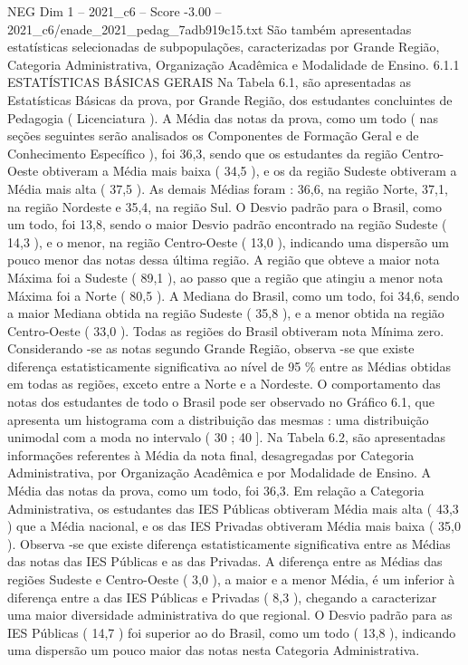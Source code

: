 \begin{textsample}{NEG Dim 1 – 2021\_c6 – Score -3.00 – 2021\_c6/enade\_2021\_pedag\_7adb919c15.txt}
São também apresentadas estatísticas selecionadas de subpopulações, caracterizadas por Grande Região, Categoria Administrativa, Organização Acadêmica e Modalidade de Ensino. 6.1.1 ESTATÍSTICAS BÁSICAS GERAIS Na Tabela 6.1, são apresentadas as Estatísticas Básicas da prova, por Grande Região, dos estudantes concluintes de Pedagogia ( Licenciatura ).
A Média das notas da prova, como um todo ( nas seções seguintes serão analisados os Componentes de Formação Geral e de Conhecimento Específico ), foi 36,3, sendo que os estudantes da região Centro-Oeste obtiveram a Média mais baixa ( 34,5 ), e os da região Sudeste obtiveram a Média mais alta ( 37,5 ).
As demais Médias foram : 36,6, na região Norte, 37,1, na região Nordeste e 35,4, na região Sul.
O Desvio padrão para o Brasil, como um todo, foi 13,8, sendo o maior Desvio padrão encontrado na região Sudeste ( 14,3 ), e o menor, na região Centro-Oeste ( 13,0 ), indicando uma dispersão um pouco menor das notas dessa última região.
A região que obteve a maior nota Máxima foi a Sudeste ( 89,1 ), ao passo que a região que atingiu a menor nota Máxima foi a Norte ( 80,5 ).
A Mediana do Brasil, como um todo, foi 34,6, sendo a maior Mediana obtida na região Sudeste ( 35,8 ), e a menor obtida na região Centro-Oeste ( 33,0 ).
Todas as regiões do Brasil obtiveram nota Mínima zero.
Considerando -se as notas segundo Grande Região, observa -se que existe diferença estatisticamente significativa ao nível de 95 \% entre as Médias obtidas em todas as regiões, exceto entre a Norte e a Nordeste.
O comportamento das notas dos estudantes de todo o Brasil pode ser observado no Gráfico 6.1, que apresenta um histograma com a distribuição das mesmas : uma distribuição unimodal com a moda no intervalo ( 30 ; 40 ].
Na Tabela 6.2, são apresentadas informações referentes à Média da nota final, desagregadas por Categoria Administrativa, por Organização Acadêmica e por Modalidade de Ensino.
A Média das notas da prova, como um todo, foi 36,3.
Em relação a Categoria Administrativa, os estudantes das IES Públicas obtiveram Média mais alta ( 43,3 ) que a Média nacional, e os das IES Privadas obtiveram Média mais baixa ( 35,0 ).
Observa -se que existe diferença estatisticamente significativa entre as Médias das notas das IES Públicas e as das Privadas.
A diferença entre as Médias das regiões Sudeste e Centro-Oeste ( 3,0 ), a maior e a menor Média, é um inferior à diferença entre a das IES Públicas e Privadas ( 8,3 ), chegando a caracterizar uma maior diversidade administrativa do que regional.
O Desvio padrão para as IES Públicas ( 14,7 ) foi superior ao do Brasil, como um todo ( 13,8 ), indicando uma dispersão um pouco maior das notas nesta Categoria Administrativa.

\end{textsample}
